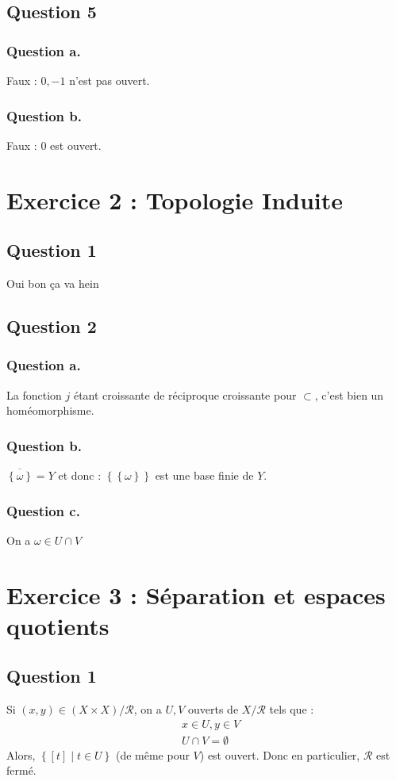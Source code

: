 \documentclass{cours}
\begin{document}
    \subsection{Question 5}
        \subsubsection{Question a.}
            Faux : ${0, -1}$ n'est pas ouvert. 
        \subsubsection{Question b.}
            Faux : ${0}$ est ouvert. 
    
\section{Exercice 2 : Topologie Induite}
    \subsection{Question 1}
        Oui bon ça va hein

    \subsection{Question 2}
        \subsubsection{Question a.}
            La fonction $j$ étant croissante de réciproque croissante pour $\subset$, c'est bien un homéomorphisme. 
        \subsubsection{Question b.}
            $\overline{\left\{\omega\right\}} = Y$ et donc : $\left\{\left\{\omega\right\}\right\}$ est une base finie de $Y$.
        \subsubsection{Question c.}
            On a $\omega \in U \cap V$

\section{Exercice 3 : Séparation et espaces quotients}
    \subsection{Question 1}
        Si $(x, y) \in (X \times X)/\mathcal{R}$, on a $U, V$ ouverts de $X/\mathcal{R}$ tels que : 
        \[
            \begin{aligned}
                &x \in U, y \in V\\
                &U\cap V = \emptyset
            \end{aligned}    
        \]
        Alors, $\left\{\left[t\right] \mid t \in U\right\}$ (de même pour $V$) est ouvert. Donc en particulier, $\mathcal{R}$ est fermé.
\end{document}
